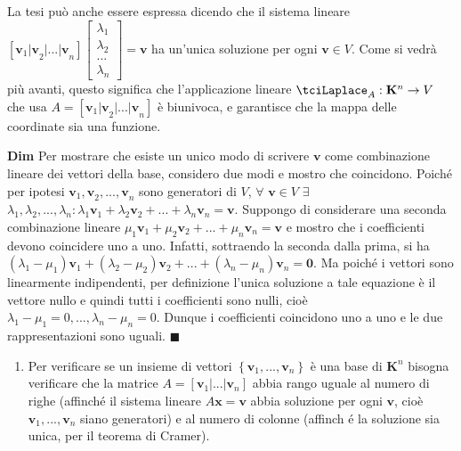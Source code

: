 \documentclass{article}
\begin{document}
La tesi pu\`{o} anche essere espressa dicendo che il sistema lineare $\left[ 
\mathbf{v}_{1}\mathbf{|v}_{2}\mathbf{|...|v}_{n}\right] \left[ 
\begin{array}{c}
\lambda _{1} \\ 
\lambda _{2} \\ 
... \\ 
\lambda _{n}%
\end{array}%
\right] =\mathbf{v}$ ha un'unica soluzione per ogni $\mathbf{v}\in V$. Come
si vedr\`{a} pi\`{u} avanti, questo significa che l'applicazione lineare $%
\tciLaplace _{A}:\mathbf{K}^{n}\rightarrow V$ che usa $A=\left[ \mathbf{v}%
_{1}\mathbf{|v}_{2}\mathbf{|...|v}_{n}\right] $ \`{e} biunivoca, e
garantisce che la mappa delle coordinate sia una funzione.

\textbf{Dim} Per mostrare che esiste un unico modo di scrivere $\mathbf{v}$
come combinazione lineare dei vettori della base, considero due modi e
mostro che coincidono. Poich\'{e} per ipotesi $\mathbf{v}_{1}\mathbf{,v}_{2}%
\mathbf{,...,v}_{n}$ sono generatori di $V$, $\forall $ $\mathbf{v}\in V$ $%
\exists $ $\lambda _{1},\lambda _{2},...,\lambda _{n}:\lambda _{1}\mathbf{v}%
_{1}+\lambda _{2}\mathbf{v}_{2}+...+\lambda _{n}\mathbf{v}_{n}=\mathbf{v}$.
Suppongo di considerare una seconda combinazione lineare $\mu _{1}\mathbf{v}%
_{1}+\mu _{2}\mathbf{v}_{2}+...+\mu _{n}\mathbf{v}_{n}=\mathbf{v}$ e mostro
che i coefficienti devono coincidere uno a uno. Infatti, sottraendo la
seconda dalla prima, si ha $\left( \lambda _{1}-\mu _{1}\right) \mathbf{v}%
_{1}+\left( \lambda _{2}-\mu _{2}\right) \mathbf{v}_{2}+...+\left( \lambda
_{n}-\mu _{n}\right) \mathbf{v}_{n}=\mathbf{0}$. Ma poich\'{e} i vettori
sono linearmente indipendenti, per definizione l'unica soluzione a tale
equazione \`{e} il vettore nullo e quindi tutti i coefficienti sono nulli,
cio\`{e} $\lambda _{1}-\mu _{1}=0,...,\lambda _{n}-\mu _{n}=0$. Dunque i
coefficienti coincidono uno a uno e le due rappresentazioni sono uguali. $%
\blacksquare $

\begin{enumerate}
\item Per verificare se un insieme di vettori $\left\{ \mathbf{v}_{1},...,%
\mathbf{v}_{n}\right\} $ \`{e} una base di $\mathbf{K}^{n}$ bisogna
verificare che la matrice $A=\left[ \mathbf{v}_{1}|...|\mathbf{v}_{n}\right] 
$ abbia rango uguale al numero di righe (affinch\'{e} il sistema lineare $A%
\mathbf{x=v}$ abbia soluzione per ogni $\mathbf{v}$, cio\`{e} $\mathbf{v}%
_{1},...,\mathbf{v}_{n}$ siano generatori) e al numero di colonne (affinch%
\'{e} la soluzione sia unica, per il teorema di Cramer).
\end{enumerate}
\end{document}
